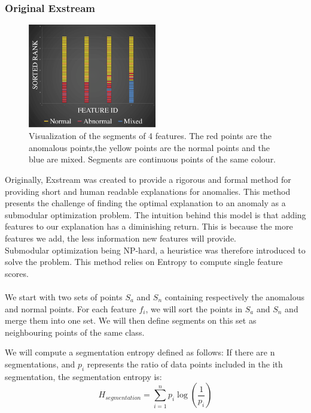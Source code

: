 \documentclass[oneside, a4paper, onecolumn, 11pt]{article}
\begin{document}
\subsubsection{Original Exstream}
\begin{figure}[h]
  \centering
  \includegraphics[width=0.5\textwidth]{images/exstreamplot.png}
  \caption{Visualization of the segments of 4 features. The red points are the anomalous points,the yellow points are the normal points and the blue are mixed. Segments are continuous points of the same colour.}
  \label{fig:exstreamplot}
\end{figure}
Originally, Exstream was created to provide a rigorous and formal method for providing short and human readable explanations for anomalies. This method presents the challenge of finding the optimal explanation to an anomaly as a submodular optimization problem. The intuition behind this model is that adding features to our explanation has a diminishing return. This is because the more features we add, the less information new features will provide.\\
Submodular optimization being NP-hard, a heuristice was therefore introduced to solve the problem. This method relies on Entropy to compute single feature scores.\\\\
We start with two sets of points $S_a$ and $S_n$ containing respectively the anomalous and normal points.
For each feature $f_i$, we will sort the points in $S_a$ and $S_n$ and merge them into one set. We will then define segments on this set as neighbouring points of the same class.

We will compute a segmentation entropy defined as follows:
If there are n segmentations, and $p_i$ represents the ratio of data points included in the ith segmentation, the segmentation entropy is:
\begin{equation}
    H_{segmentation} = \sum_{i=1}^{n} p_i \log(\frac{1}{p_i})
\end{equation}
\end{document}
